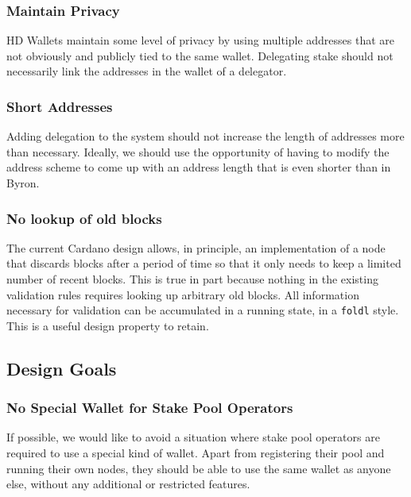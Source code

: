 \documentclass[11pt,a4paper,dvipsnames,twosided]{article}
\begin{document}
\subsubsection{Maintain Privacy}
\label{maintain-privacy}

HD Wallets maintain some level of privacy by using multiple addresses
that are not obviously and publicly tied to the same wallet. Delegating
stake should not necessarily link the addresses in the wallet of a
delegator.

\subsubsection{Short Addresses}
\label{short-addresses}

Adding delegation to the system should not increase the length of
addresses more than necessary. Ideally, we should use the opportunity of having
to modify the address scheme to come up with an address length that is
even shorter than in Byron.

\subsubsection{No lookup of old blocks}
\label{no-lookup-of-old-blocks}

The current Cardano design allows, in principle, an implementation of a
node that discards blocks after a period of time so that it only needs
to keep a limited number of recent blocks. This is true in part because
nothing in the existing validation rules requires looking up arbitrary
old blocks. All information necessary for validation can be accumulated
in a running state, in a \texttt{foldl} style. This is a useful design
property to retain.

\subsection{Design Goals}
\label{design-goals}

\subsubsection{No Special Wallet for Stake Pool Operators}
\label{no-special-wallet-for-stake-pool-operators}

If possible, we would like to avoid a situation where stake pool
operators are required to use a special kind of wallet. Apart from
registering their pool and running their own nodes, they should be able
to use the same wallet as anyone else, without any additional or
restricted features.
\end{document}
